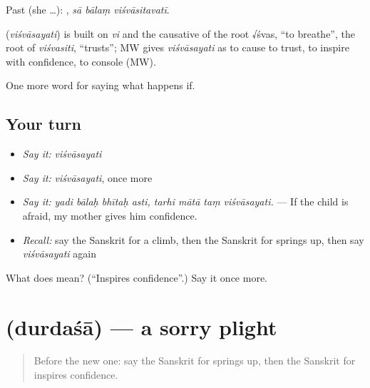Past (she …):   , \emph{sā bālaṃ viśvāsitavatī}.

\begin{cousinweb}
\textbf{} (\emph{viśvāsayati}) is built on \emph{vi} and the causative of the root √śvas, \textquotedblleft{}to breathe\textquotedblright{}, the root of \emph{viśvasiti}, \textquotedblleft{}trusts\textquotedblright{}; MW gives \emph{viśvāsayati} as to cause to trust, to inspire with confidence, to console (MW).
\end{cousinweb}

\begin{grammarlens}[title={What you've built}]
One more word for saying what happens if.
\end{grammarlens}

\subsection*{Your turn}
\begin{itemize}
\raggedright
  \item \emph{Say it:} \emph{viśvāsayati}
  \item \emph{Say it:} \emph{viśvāsayati}, once more
  \item \emph{Say it:} \emph{yadi bālaḥ bhītaḥ asti, tarhi mātā taṃ viśvāsayati.} — If the child is afraid, my mother gives him confidence.
  \item \emph{Recall:} say the Sanskrit for a climb, then the Sanskrit for springs up, then say \emph{viśvāsayati} again
\end{itemize}

\begin{tcolorbox}[breakable,colback=teal!4,colframe=teal!35!black,title={Before you move on}]
What does  mean? (\textquotedblleft{}Inspires confidence\textquotedblright{}.) Say it once more.
\end{tcolorbox}
\section[\texorpdfstring{\sk{दुर्दशा} (durdaśā)}{दुर्दशा (durdaśā)}]{ (durdaśā) — a sorry plight}

\label{lesson:SA-C548-durdasa}



\begin{quote}
Before the new one: say the Sanskrit for springs up, then the Sanskrit for inspires confidence.
\end{quote}

